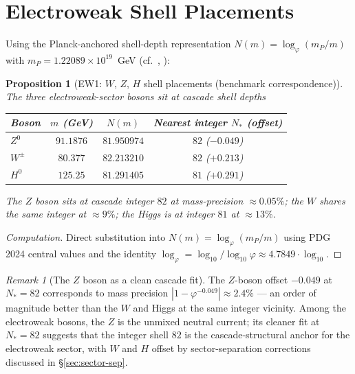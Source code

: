 \documentclass[12pt]{article}
\newtheorem{proposition}[theorem]{Proposition}
\theoremstyle{definition}
\theoremstyle{remark}
\newtheorem{remark}[theorem]{Remark}
\begin{document}
\section{Electroweak Shell Placements}\label{sec:shells}

Using the Planck-anchored shell-depth representation $N(m) = \log_\varphi(m_P / m)$ with $m_P = 1.22089 \times 10^{19}$~GeV (cf.~\citep{SmartXXXVII}, \citep{SmartXXXVIII}):

\begin{proposition}[EW1: $W$, $Z$, $H$ shell placements (benchmark correspondence)]\label{prop:ew-shells}
The three electroweak-sector bosons sit at cascade shell depths
\begin{center}
\begin{tabular}{@{}lccc@{}}
\toprule
Boson & $m$ (GeV) & $N(m)$ & Nearest integer $N_*$ (offset) \\
\midrule
$Z^0$ & $91.1876$ & $81.950974$ & $82$ ($-0.049$) \\
$W^\pm$ & $80.377$ & $82.213210$ & $82$ ($+0.213$) \\
$H^0$ & $125.25$ & $81.291405$ & $81$ ($+0.291$) \\
\bottomrule
\end{tabular}
\end{center}
The $Z$ boson sits at cascade integer $82$ at mass-precision $\approx 0.05\%$; the $W$ shares the same integer at $\approx 9\%$; the Higgs is at integer $81$ at $\approx 13\%$.
\end{proposition}

\begin{proof}[Computation]
Direct substitution into $N(m) = \log_\varphi(m_P/m)$ using PDG 2024 central values and the identity $\log_\varphi = \log_{10}/\log_{10}\varphi \approx 4.7849 \cdot \log_{10}$.
\end{proof}

\begin{remark}[The $Z$ boson as a clean cascade fit]
The $Z$-boson offset $-0.049$ at $N_* = 82$ corresponds to mass precision $|1 - \varphi^{-0.049}| \approx 2.4\%$ --- an order of magnitude better than the $W$ and Higgs at the same integer vicinity. Among the electroweak bosons, the $Z$ is the unmixed neutral current; its cleaner fit at $N_* = 82$ suggests that the integer shell $82$ is the cascade-structural anchor for the electroweak sector, with $W$ and $H$ offset by sector-separation corrections discussed in \S\ref{sec:sector-sep}.
\end{remark}
\end{document}

